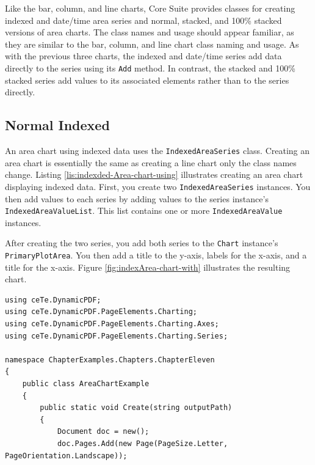 \documentclass[american]{tufte-book}
\numberwithin{equation}{section}
\numberwithin{figure}{section}
\begin{document}
{\medskip{}

Like the bar, column, and line charts, Core Suite provides classes
for creating indexed and date/time area series and normal, stacked,
and 100\% stacked versions of area charts. The class names and usage
should appear familiar, as they are similar to the bar, column, and
line chart class naming and usage. As with the previous three charts,
the indexed and date/time series add data directly to the series using
its \texttt{Add} method. In contrast, the stacked and 100\% stacked
series add values to its associated elements rather than to the series
directly.

\subsection{Normal Indexed}

An area chart using indexed data uses the \texttt{IndexedAreaSeries}
class. Creating an area chart is essentially the same as creating
a line chart only the class names change. Listing \ref{lis:indexded-Area-chart-using}
illustrates creating an area chart displaying indexed data. First,
you create two \texttt{IndexedAreaSeries} instances. You then add values
to each series by adding values to the series instance's \texttt{IndexedAreaValueList}.
This list contains one or more \texttt{IndexedAreaValue} instances. 

After creating the two series, you add both series to the \texttt{Chart}
instance's \texttt{PrimaryPlotArea}. You then add a title to the y-axis,
labels for the x-axis, and a title for the x-axis. Figure \ref{fig:indexArea-chart-with}
illustrates the resulting chart.

\bgroup{}
\begin{lstlisting}[caption={Area chart using indexed data.},label={lis:indexded-Area-chart-using},basicstyle={\footnotesize\ttfamily},breaklines=true]
using ceTe.DynamicPDF;
using ceTe.DynamicPDF.PageElements.Charting;
using ceTe.DynamicPDF.PageElements.Charting.Axes;
using ceTe.DynamicPDF.PageElements.Charting.Series;

namespace ChapterExamples.Chapters.ChapterEleven
{
    public class AreaChartExample
    {
        public static void Create(string outputPath)
        {
            Document doc = new();
            doc.Pages.Add(new Page(PageSize.Letter, PageOrientation.Landscape));


\end{lstlisting}}
\end{document}
